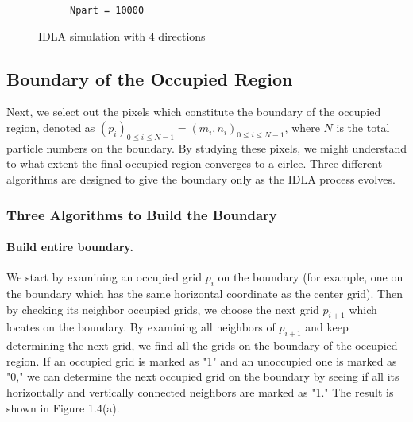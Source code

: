 \documentclass[letterpaper]{article}
\numberwithin{equation}{section} %
\numberwithin{figure}{section} %
\numberwithin{table}{section} %
\begin{document}
\begin{figure}[htbp]
\begin{subfigure}[b]{0.3\textwidth}
		\caption{\texttt{Npart = 10000}}
		\label{4direct_Npart10000_3suW11T}
	\end{subfigure}
	\caption{IDLA simulation with 4 directions}
	\label{IDLA simulation with 4 directions}
\end{figure}


\subsection{Boundary of the Occupied Region}
Next, we select out the pixels which constitute the boundary of the occupied region, denoted as $(p_i)_{0 \leq i \leq N-1}=(m_i,n_i)_{0 \leq i \leq N-1}$, where $N$ is the total particle numbers on the boundary. By studying these pixels, we might understand to what extent the final occupied region converges to a cirlce. Three different algorithms are designed to give the boundary only as the IDLA process evolves. 

\subsubsection{Three Algorithms to Build the Boundary}

\paragraph{Build entire boundary.}
We start by examining an occupied grid $p_i$ on the boundary (for example, one on the boundary which has the same horizontal coordinate as the center grid). Then by checking its neighbor occupied grids, we choose the next grid $p_{i+1}$ which locates on the boundary. By examining all neighbors of $p_{i+1}$ and keep determining the next grid, we find all the grids on the boundary of the occupied region. If an occupied grid is marked as "1" and an unoccupied one is marked as "0," we can determine the next occupied grid on the boundary by seeing if all its horizontally and vertically connected neighbors are marked as "1." The result is shown in Figure 1.4(a).
\end{document}
